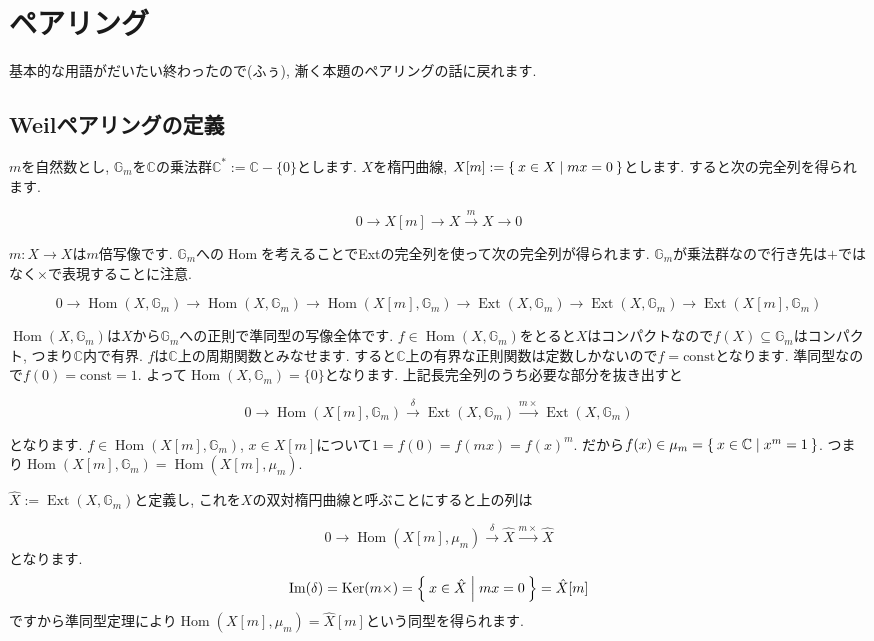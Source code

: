 \documentclass{jsarticle}
\newcommand{\CC}{\mathbb{C}}
\newcommand{\GG}{\mathbb{G}}
\newcommand{\makeop}[1]{\mathop{\mathrm{#1}}\nolimits}
\def\Im{\makeop{Im}}
\def\Ker{\makeop{Ker}}
\def\Hom{\makeop{Hom}}
\def\Ext{\makeop{Ext}}
\theoremstyle{definition}
\numberwithin{theorem}{section}
\begin{document}
\section{ペアリング}
基本的な用語がだいたい終わったので(ふぅ), 漸く本題のペアリングの話に戻れます.

\subsection{Weilペアリングの定義}

$m$を自然数とし, $\GG_m$を$\CC$の乗法群$\CC^* := \CC - \{0\}$とします. $X$を楕円曲線, $X[m] := \Set{x \in X | mx = 0}$とします. すると次の完全列を得られます.

\begin{equation*}
0 \rightarrow X[m] \rightarrow X \xrightarrow{m} X \rightarrow 0
\end{equation*}

$m : X \rightarrow X$は$m$倍写像です. $\GG_m$への$\Hom$を考えることでExtの完全列を使って次の完全列が得られます.
$\GG_m$が乗法群なので行き先は$+$ではなく$\times$で表現することに注意.

\begin{equation*}
0 \rightarrow \Hom(X, \GG_m) \rightarrow \Hom(X, \GG_m) \rightarrow \Hom(X[m], \GG_m) \rightarrow \Ext(X, \GG_m) \rightarrow \Ext(X, \GG_m) \rightarrow \Ext(X[m], \GG_m)
\end{equation*}

$\Hom(X, \GG_m)$は$X$から$\GG_m$への正則で準同型の写像全体です.
$f\in\Hom(X, \GG_m)$をとると$X$はコンパクトなので$f(X) \subseteq\GG_m$はコンパクト, つまり$\CC$内で有界. $f$は$\CC$上の周期関数とみなせます. すると$\CC$上の有界な正則関数は定数しかないので$f = \mathrm{const}$となります. 準同型なので$f(0) = \mathrm{const} = 1$. よって$\Hom(X, \GG_m) = \{0\}$となります. 上記長完全列のうち必要な部分を抜き出すと

\begin{equation*}
0 \rightarrow \Hom(X[m], \GG_m) \xrightarrow{\delta} \Ext(X, \GG_m) \xrightarrow{m\times} \Ext(X, \GG_m)
\end{equation*}

となります. $f \in \Hom(X[m], \GG_m)$, $x \in X[m]$について$1 = f(0) = f(mx) = f(x)^m$. だから$f(x) \in \mu_m = \Set{x \in \CC | x^m = 1}$. つまり$\Hom(X[m], \GG_m) = \Hom(X[m], \mu_m)$.

$\hat{X} := \Ext(X, \GG_m)$と定義し, これを$X$の双対楕円曲線と呼ぶことにすると上の列は

\begin{equation*}
0 \rightarrow \Hom(X[m], \mu_m) \xrightarrow{\delta} \hat{X} \xrightarrow{m\times} \hat{X}
\end{equation*}
となります.
\[
\Im(\delta) = \Ker(m\times) = \Set{x \in \hat{X} | mx = 0} = \hat{X}[m]
\]
ですから準同型定理により$\Hom(X[m], \mu_m) = \hat{X}[m]$という同型を得られます.
\end{document}
